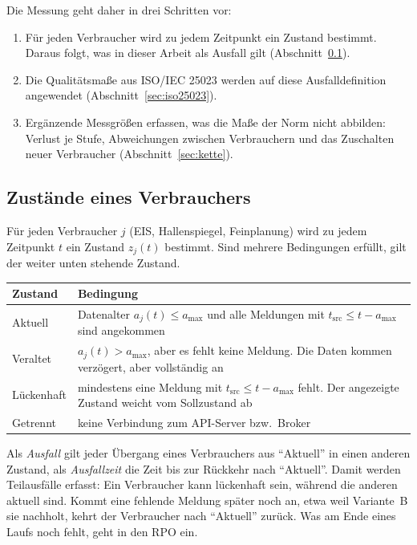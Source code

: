 \documentclass[11pt, a4paper]{article}
\begin{document}
Die Messung geht daher in drei Schritten vor:
\begin{enumerate}[nosep]
    \item Für jeden Verbraucher wird zu jedem Zeitpunkt ein Zustand bestimmt. Daraus folgt, was in dieser Arbeit als Ausfall gilt (Abschnitt~\ref{sec:zustaende}).
    \item Die Qualitätsmaße aus ISO/IEC 25023 werden auf diese Ausfalldefinition angewendet (Abschnitt~\ref{sec:iso25023}).
    \item Ergänzende Messgrößen erfassen, was die Maße der Norm nicht abbilden: Verlust je Stufe, Abweichungen zwischen Verbrauchern und das Zuschalten neuer Verbraucher (Abschnitt~\ref{sec:kette}).
\end{enumerate}

\subsection{Zustände eines Verbrauchers}
\label{sec:zustaende}

Für jeden Verbraucher $j$ (EIS, Hallenspiegel, Feinplanung) wird zu jedem Zeitpunkt $t$ ein Zustand $z_j(t)$ bestimmt. Sind mehrere Bedingungen erfüllt, gilt der weiter unten stehende Zustand.

\begin{center}
\small
\begin{tabularx}{\textwidth}{@{}p{2.6cm} X@{}}
\toprule
\textbf{Zustand} & \textbf{Bedingung} \\
\midrule
Aktuell & Datenalter $a_j(t) \le a_{\max}$ und alle Meldungen mit $t_{\text{src}} \le t - a_{\max}$ sind angekommen \\
Veraltet & $a_j(t) > a_{\max}$, aber es fehlt keine Meldung. Die Daten kommen verzögert, aber vollständig an \\
Lückenhaft & mindestens eine Meldung mit $t_{\text{src}} \le t - a_{\max}$ fehlt. Der angezeigte Zustand weicht vom Sollzustand ab \\
Getrennt & keine Verbindung zum API-Server bzw.\ Broker \\
\bottomrule
\end{tabularx}
\end{center}

Als \emph{Ausfall} gilt jeder Übergang eines Verbrauchers aus \enquote{Aktuell} in einen anderen Zustand, als \emph{Ausfallzeit} die Zeit bis zur Rückkehr nach \enquote{Aktuell}. Damit werden Teilausfälle erfasst: Ein Verbraucher kann lückenhaft sein, während die anderen aktuell sind. Kommt eine fehlende Meldung später noch an, etwa weil Variante~B sie nachholt, kehrt der Verbraucher nach \enquote{Aktuell} zurück. Was am Ende eines Laufs noch fehlt, geht in den RPO ein.
\end{document}
